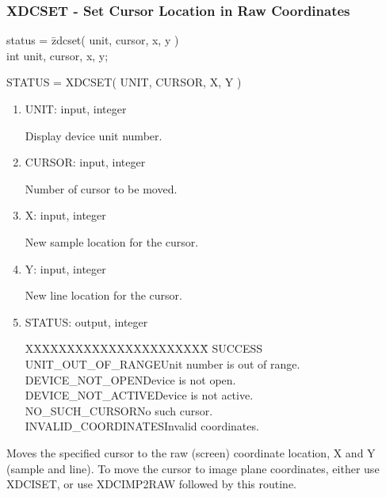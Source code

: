 \subsubsection{XDCSET - Set Cursor Location in Raw Coordinates}
\begin{tabbing}
status = \=zdcset( unit, cursor, x, y )\\
\>int  unit, cursor, x, y;\\
\end{tabbing}
STATUS = XDCSET( UNIT, CURSOR, X, Y )
\begin{enumerate}
\item UNIT:  input, integer

Display device unit number.
\item CURSOR:  input, integer

Number of cursor to be moved.
\item X:  input, integer

New sample location for the cursor.
\item Y:  input, integer

New line location for the cursor.
\item STATUS:  output, integer
\begin{tabbing}
XXXXXXXXXXXXXXXXXXXXXX\=\kill
SUCCESS\\
UNIT\_OUT\_OF\_RANGE\>Unit number is out of range.\\
DEVICE\_NOT\_OPEN\>Device is not open.\\
DEVICE\_NOT\_ACTIVE\>Device is not active.\\
NO\_SUCH\_CURSOR\>No such cursor.\\
INVALID\_COORDINATES\>Invalid coordinates.\\
\end{tabbing}
\end{enumerate}
Moves the specified cursor to the raw (screen) coordinate location,
X and Y (sample and line).  To move the cursor to image plane
coordinates, either use XDCISET, or use XDCIMP2RAW followed by this
routine.
\newpage
